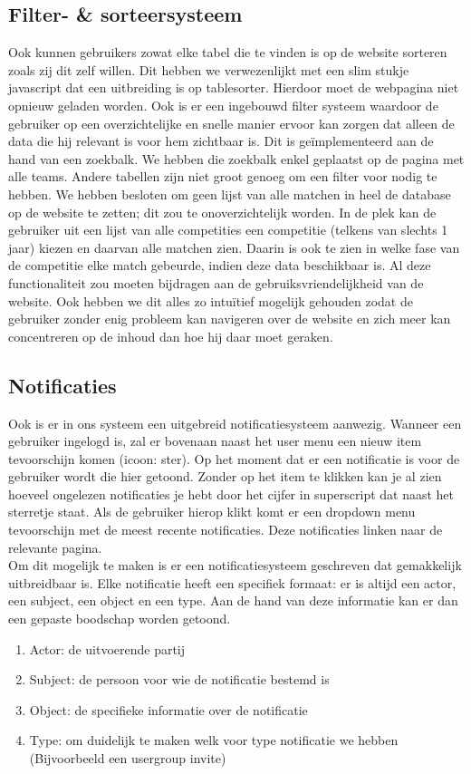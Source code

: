 \documentclass[11pt, a4paper]{article}
\begin{document}
\subsection{Filter- \& sorteersysteem}
Ook kunnen gebruikers zowat elke tabel die te vinden is op de website sorteren zoals zij dit zelf willen. Dit hebben we verwezenlijkt met een slim stukje javascript dat een uitbreiding is op tablesorter. Hierdoor moet de webpagina niet opnieuw geladen worden. Ook is er een ingebouwd filter systeem waardoor de gebruiker op een overzichtelijke en snelle manier ervoor kan zorgen dat alleen de data die hij relevant is voor hem zichtbaar is. Dit is ge\"implementeerd aan de hand van een zoekbalk. We hebben die zoekbalk enkel geplaatst op de pagina met alle teams. Andere tabellen zijn niet groot genoeg om een filter voor nodig te hebben. We hebben besloten om geen lijst van alle matchen in heel de database op de website te zetten; dit zou te onoverzichtelijk worden. In de plek kan de gebruiker uit een lijst van alle competities een competitie (telkens van slechts 1 jaar) kiezen en daarvan alle matchen zien. Daarin is ook te zien in welke fase van de competitie elke match gebeurde, indien deze data beschikbaar is.
Al deze functionaliteit zou moeten bijdragen aan de gebruiksvriendelijkheid van de website. Ook hebben we dit alles zo intu\"itief mogelijk gehouden zodat de gebruiker zonder enig probleem kan navigeren over de website en zich meer kan concentreren op de inhoud dan hoe hij daar moet geraken.



\subsection{Notificaties}
Ook is er in ons systeem een uitgebreid notificatiesysteem aanwezig. Wanneer een gebruiker ingelogd is, zal er bovenaan naast het user menu een nieuw item tevoorschijn komen (icoon: ster). Op het moment dat er een notificatie is voor de gebruiker wordt die hier getoond. Zonder op het item te klikken kan je al zien hoeveel ongelezen notificaties je hebt door het cijfer in superscript dat naast het sterretje staat. Als de gebruiker hierop klikt komt er een dropdown menu tevoorschijn met de meest recente notificaties. Deze notificaties linken naar de relevante pagina. \\
Om dit mogelijk te maken is er een notificatiesysteem geschreven dat gemakkelijk uitbreidbaar is. Elke notificatie heeft een specifiek formaat: er is altijd een actor, een subject, een object en een type. Aan de hand van deze informatie kan er dan een gepaste boodschap worden getoond.
\begin{enumerate}
\item Actor: de uitvoerende partij
\item Subject: de persoon voor wie de notificatie bestemd is
\item Object: de specifieke informatie over de notificatie
\item Type: om duidelijk te maken welk voor type notificatie we hebben (Bijvoorbeeld een usergroup invite)
\end{enumerate}
\end{document}

